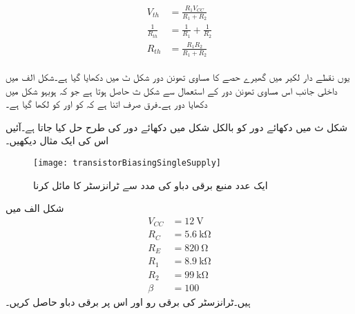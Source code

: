 \begin{gather} \label{مساوات_ٹرانزسٹر_تھونن_دباو_اور_مزاحمت}
\begin{aligned}
V_{th}&=\frac{R_1 V_{CC} }{R_1+R_2}\\
\frac{1}{R_{th}} &=\frac{1}{R_1} +\frac{1}{R_2}\\
R_{th} &=\frac{R_1 R_2 }{R_1+R_2}
\end{aligned}
\end{gather}

یوں نقطے دار لکیر میں گھیرے حصے کا مساوی تھونن دور شکل  ٹ میں دکھایا گیا ہے۔شکل  الف میں داخلی جانب اس مساوی تھونن دور کے استعمال سے شکل  ث حاصل ہوتا ہے جو کہ ہوبہو شکل   میں دکھایا دور ہے۔فرق صرف اتنا ہے کہ  کو  اور  کو  لکھا گیا ہے۔

شکل  ث میں دکھائے دور کو بالکل شکل   میں دکھائے دور کی طرح حل کیا جاتا ہے۔آئیں اس کی ایک مثال دیکھیں۔
\begin{figure}
\centering
\texttt{[image: transistorBiasingSingleSupply]}
\caption{ایک عدد منبع برقی دباو کی مدد سے ٹرانزسٹر کا مائل کرنا}
\label{شکل_ایک_عدد_پیداکار_برقی_دباو_سے_مائل}
\end{figure}

شکل  الف میں
\begin{align*}
V_{CC}&=\SI{12}{\volt}\\
R_C&=\SI{5.6}{\kilo \ohm}\\
R_E&=\SI{820}{\ohm} \\
R_1&=\SI{8.9}{\kilo \ohm}\\
R_2 &=\SI{99}{\kilo \ohm}\\
\beta&=100
\end{align*}
ہیں۔ٹرانزسٹر کی برقی رو  اور اس پر برقی دباو  حاصل کریں۔

